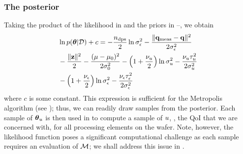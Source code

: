 \subsubsection{The posterior}
Taking the product of the likelihood in  and the priors in --, we obtain
\begin{align}
  & \ln \f{\vparam | \Data} + c = -\frac{\ndps}{2} \ln \sigma^2_\noise - \frac{\norm{\mvT_\meas - \mvT}^2}{2 \sigma^2_\noise} \nonumber \\
  & {} - \frac{\norm{\vz}^2}{2} - \frac{(\mu - \mu_0)^2}{2 \sigma^2_0} - \left(1 + \frac{\nu_\u}{2}\right) \ln \sigma^2_\u - \frac{\nu_\u \tau_\u^2}{2 \sigma^2_\u} \nonumber \\
  & {} - \left(1 + \frac{\nu_\noise}{2}\right) \ln \sigma^2_\noise - \frac{\nu_\noise \tau_\noise^2}{2 \sigma^2_\noise} \elabel{log-posterior}
\end{align}
where $c$ is some constant. This expression is sufficient for the Metropolis algorithm (see ); thus, we can readily draw samples from the posterior. Each sample of ${\boldsymbol\theta}_u$ is then used in  to compute a sample of $u$, \ie, the QoI that we are concerned with, for all processing elements on the wafer.
Note, however, the likelihood function poses a significant computational challenge as each sample requires an evaluation of $\model$; we shall address this issue in .
